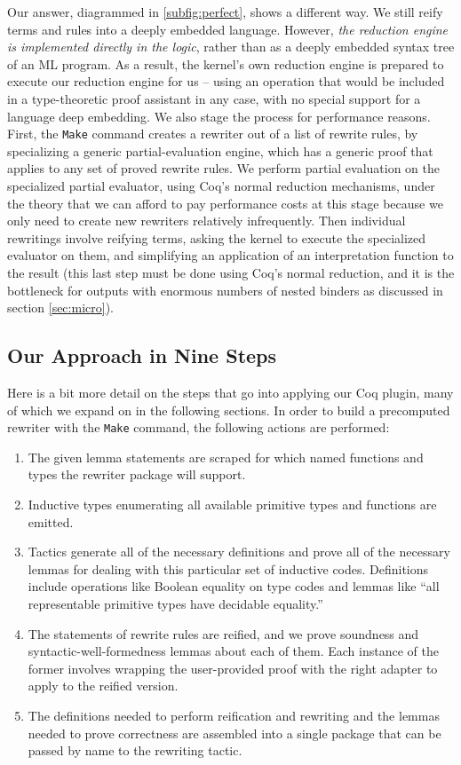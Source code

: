 \documentclass[sigplan,10pt,review,anonymous]{acmart}\settopmatter{printfolios=true,printccs=false,printacmref=false}
\begin{document}
Our answer, diagrammed in \autoref{subfig:perfect}, shows a different way.
We still reify terms and rules into a deeply embedded language.
However, \emph{the reduction engine is implemented directly in the logic}, rather than as a deeply embedded syntax tree of an ML program.
As a result, the kernel's own reduction engine is prepared to execute our reduction engine for us -- using an operation that would be included in a type-theoretic proof assistant in any case, with no special support for a language deep embedding.
We also stage the process for performance reasons.
First, the \texttt{Make} command creates a rewriter out of a list of rewrite rules, by specializing a generic partial-evaluation engine, which has a generic proof that applies to any set of proved rewrite rules.
We perform partial evaluation on the specialized partial evaluator, using Coq's normal reduction mechanisms, under the theory that we can afford to pay performance costs at this stage because we only need to create new rewriters relatively infrequently.
Then individual rewritings involve reifying terms, asking the kernel to execute the specialized evaluator on them, and simplifying an application of an interpretation function to the result (this last step must be done using Coq's normal reduction, and it is the bottleneck for outputs with enormous numbers of nested binders as discussed in section \ref{sec:micro}).

\subsection{Our Approach in Nine Steps} \label{sec:nine-steps}

Here is a bit more detail on the steps that go into applying our Coq plugin, many of which we expand on in the following sections.
In order to build a precomputed rewriter with the \texttt{Make} command, the following actions are performed:
\begin{enumerate}
\item
  The given lemma statements are scraped for which named functions and types the rewriter package will support.
\item
  Inductive types enumerating all available primitive types and functions are emitted.
\item
  Tactics generate all of the necessary definitions and prove all of the necessary lemmas for dealing with this particular set of inductive codes.
  Definitions include operations like Boolean equality on type codes and lemmas like ``all representable primitive types have decidable equality.''
\item
  The statements of rewrite rules are reified, and we prove soundness and syntactic-well-formedness lemmas about each of them.
  Each instance of the former involves wrapping the user-provided proof with the right adapter to apply to the reified version.
\item
  The definitions needed to perform reification and rewriting and the lemmas needed to prove correctness are assembled into a single package that can be passed by name to the rewriting tactic.
\end{enumerate}
\end{document}
